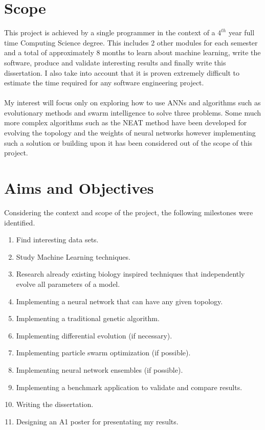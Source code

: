 \documentclass[a4paper,12pt, oneside]{memoir}
\begin{document}
\section{Scope}

This project is achieved by a single programmer in the context of a $4^{th}$ year full time Computing Science degree. This includes 2 other modules for each semester and a total of approximately 8 months to learn about machine learning, write the software, produce and validate interesting results and finally write this dissertation. I also take into account that it is proven extremely difficult to estimate the time required for any software engineering project. 
\\ \\
My interest will focus only on exploring how to use ANNs and algorithms such as evolutionary methods and swarm intelligence to solve three problems. Some much more complex algorithms such as the NEAT method \cite{stanley-2002} have been developed for evolving the topology and the weights of neural networks however implementing such a solution or building upon it has been considered out of the scope of this project.

\newpage

\section{Aims and Objectives} \label{section:aims-and-objectives}
Considering the context and scope of the project, the following milestones were identified.

\begin{multicols}{2}
  \begin{enumerate}
    \setlength\itemsep{0.001em}
    \item Find interesting data sets.
    \item Study Machine Learning techniques.
    \item Research already existing biology inspired techniques that independently evolve all parameters of a model.
    \item Implementing a neural network that can have any given topology.
    \item Implementing a traditional genetic algorithm.
    \item Implementing differential evolution (if necessary).
    \item Implementing particle swarm optimization (if possible).
    \item Implementing neural network ensembles (if possible).
    \item Implementing a benchmark application to validate and compare results.
    \item Writing the dissertation.
    \item Designing an A1 poster for presentating my results.
  \end{enumerate}
\end{multicols}
\end{document}
